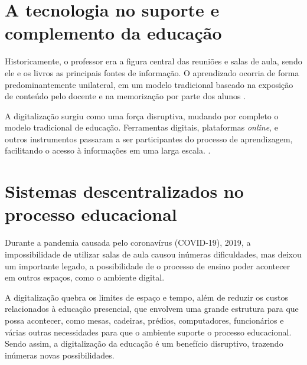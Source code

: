 \section{A tecnologia no suporte e complemento da educação}
Historicamente, o professor era a figura central das reuniões e salas de aula, sendo ele e os livros as principais fontes de informação. O aprendizado ocorria de forma predominantemente unilateral, em um modelo tradicional baseado na exposição de conteúdo pelo docente e na memorização por parte dos alunos \cite{unicep2024}.

A digitalização surgiu como uma força disruptiva, mudando por completo o modelo tradicional de educação. Ferramentas digitais, plataformas \textit{online}, e outros instrumentos passaram a ser participantes do processo de aprendizagem, facilitando o acesso à informações em uma larga escala. \cite{unicep2024}.

\section{Sistemas descentralizados no processo educacional}
Durante a pandemia causada pelo coronavírus (COVID-19), 2019, a impossibilidade de utilizar salas de aula causou inúmeras dificuldades, mas deixou um importante legado, a possibilidade de o processo de ensino poder acontecer em outros espaços, como o ambiente digital.

A digitalização quebra os limites de espaço e tempo, além de reduzir os custos relacionados à educação presencial, que envolvem uma grande estrutura para que possa acontecer, como mesas, cadeiras, prédios, computadores, funcionários e várias outras necessidades para que o ambiente suporte o processo educacional. Sendo assim, a digitalização da educação é um benefício disruptivo, trazendo inúmeras novas possibilidades.


